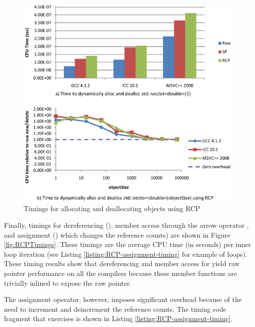 \documentclass[pdf,ps2pdf,11pt]{SANDreport}
\begin{document}
{\bsinglespace
\begin{figure}
\begin{center}
\includegraphics*[angle=0,scale=1.00]{RCPAllocTimings}
\end{center}
\caption{
\label{fig:RCPAllocTimings}
Timings for allocating and deallocating objects using RCP}
\end{figure}
\esinglespace}


Finally, timings for dereferencing ({}),
member access through the arrow operator
{}, and assignment
({}) which changes the reference counts)
are shown in Figure {}\ref{fig:RCPTimings}.  These timings are the
average CPU time (in seconds) per inner loop iteration (see Listing
{}\ref{listing:RCP-assignment-timing} for example of loops).  These
timing results show that dereferencing and member access for
{} yield raw pointer performance on all the compilers
because these member functions are trivially inlined to expose the raw
pointer.

The assignment operator, however, imposes significant overhead because
of the need to increment and deincrement the reference counts.  The
timing code fragment that exercises {} is
shown in Listing {}\ref{listing:RCP-assignment-timing}.
\end{document}
